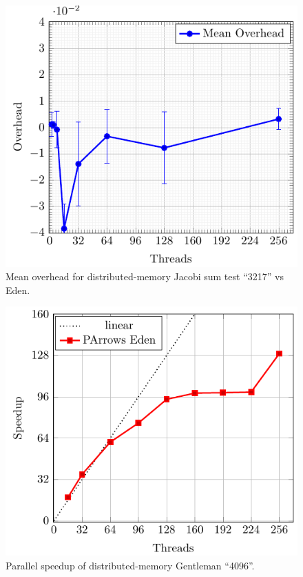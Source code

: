 \documentclass[paper=A4,twoside=true,openright,parskip=full,chapterprefix=true,headings=normal,bibliography=totoc,listof=totoc,titlepage=on,captions=tableabove,draft=false,british]{scrreprt}%
\renewcommand{\enquote}[1]{{``}#1{''}}
\begin{document}
\begin{figure}[h]
\centering
\includegraphics{src/img/overDistJacobiEden.pdf}
\caption{Mean overhead for distributed-memory Jacobi sum test
\enquote{3217} vs Eden.\label{fig:overDistJacobiEden}}
\end{figure}

\begin{figure}[h]
\centering
\includegraphics{src/img/perfDistTorus.pdf}
\caption{Parallel speedup of distributed-memory Gentleman
\enquote{4096}.\label{fig:perfDistTorus}}
\end{figure}
\end{document}
